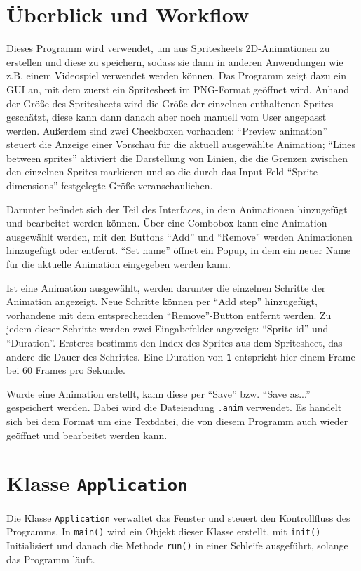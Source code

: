 \chapter{Überblick und Workflow}
Dieses Programm wird verwendet, um aus Spritesheets 2D-Animationen zu erstellen und diese zu speichern, sodass sie dann in anderen Anwendungen wie z.B. einem Videospiel verwendet werden können. Das Programm zeigt dazu ein GUI an, mit dem zuerst ein Spritesheet im PNG-Format geöffnet wird. Anhand der Größe des Spritesheets wird die Größe der einzelnen enthaltenen Sprites geschätzt, diese kann dann danach aber noch manuell vom User angepasst werden. Außerdem sind zwei Checkboxen vorhanden: ``Preview animation'' steuert die Anzeige einer Vorschau für die aktuell ausgewählte Animation; ``Lines between sprites'' aktiviert die Darstellung von Linien, die die Grenzen zwischen den einzelnen Sprites markieren und so die durch das Input-Feld ``Sprite dimensions'' festgelegte Größe veranschaulichen.

Darunter befindet sich der Teil des Interfaces, in dem Animationen hinzugefügt und bearbeitet werden können. Über eine Combobox kann eine Animation ausgewählt werden, mit den Buttons ``Add'' und ``Remove'' werden Animationen hinzugefügt oder entfernt. ``Set name'' öffnet ein Popup, in dem ein neuer Name für die aktuelle Animation eingegeben werden kann.

Ist eine Animation ausgewählt, werden darunter die einzelnen Schritte der Animation angezeigt. Neue Schritte können per ``Add step'' hinzugefügt, vorhandene mit dem entsprechenden ``Remove''-Button entfernt werden. Zu jedem dieser Schritte werden zwei Eingabefelder angezeigt: ``Sprite id'' und ``Duration''. Ersteres bestimmt den Index des Sprites aus dem Spritesheet, das andere die Dauer des Schrittes. Eine Duration von \lstinline{1} entspricht hier einem Frame bei 60 Frames pro Sekunde.

Wurde eine Animation erstellt, kann diese per ``Save'' bzw. ``Save as...'' gespeichert werden. Dabei wird die Dateiendung \lstinline{.anim} verwendet. Es handelt sich bei dem Format um eine Textdatei, die von diesem Programm auch wieder geöffnet und bearbeitet werden kann.



\chapter{Klasse \lstinline{Application}}
Die Klasse \lstinline{Application} verwaltet das Fenster und steuert den Kontrollfluss des Programms. In \lstinline{main()} wird ein Objekt dieser Klasse erstellt, mit \lstinline{init()} Initialisiert und danach die Methode \lstinline{run()} in einer Schleife ausgeführt, solange das Programm läuft.

